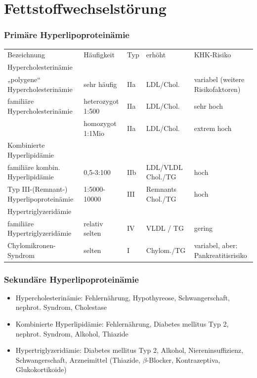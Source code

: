 \documentclass[10pt,a4paper]{report}
\begin{document}
\section{Fettstoffwechselstörung} %
\label{sec:fettstoffwechselst_rung}
\subsubsection{Primäre Hyperlipoproteinämie} %
\label{ssub:prim_re_hyperlipoprotein_mie}
\begin{tabularx}{\textwidth}{XXXXX}
Bezeichnung&Häufigkeit&Typ&erhöht&KHK-Risiko\\
Hypercholesterinämie&&&&\\
„polygene“ Hypercholesterinämie&sehr häufig&IIa&LDL/Chol.&variabel (weitere Risikofaktoren)\\				      
familiäre Hypercholesterinämie&heterozygot 1:500&IIa&LDL/Chol.&sehr hoch\\
&homozygot 1:1Mio&IIa&LDL/Chol.&extrem hoch\\
Kombinierte Hyperlipidämie&&&&\\
familiäre kombin. Hyperlipidämie&0,5-3:100&IIb&LDL/VLDL Chol./TG&hoch\\	
Typ III-(Remnant-) Hyperlipoproteinämie&1:5000-10000&III&Remnants Chol./TG&hoch\\
Hypertriglyzeridämie&&&&\\
familiäre Hypertriglyzeridämie&relativ selten&IV&VLDL / TG&gering\\			   			
Chylomikronen-Syndrom&selten&I&Chylom./TG&variabel, aber: Pankreatitisrisiko\\
\end{tabularx}
\subsubsection{Sekundäre Hyperlipoproteinämie}
\label{ssub:sekund_re_h}
\begin{itemize}
	\item Hypercholesterinämie:  Fehlernährung, Hypothyreose,	Schwangerschaft, nephrot. Syndrom, Cholestase				
	\item Kombinierte Hyperlipidämie: Fehlernährung, Diabetes mellitus Typ 2, nephrot. Syndrom, Alkohol, Thiazide			
	\item Hypertriglyzeridämie: Diabetes mellitus Typ 2, Alkohol, Niereninsuffizienz, Schwangerschaft, Arzneimittel (Thiazide, $\beta$-Blocker, Kontrazeptiva, Glukokortikoide) 
\end{itemize}
\end{document}

